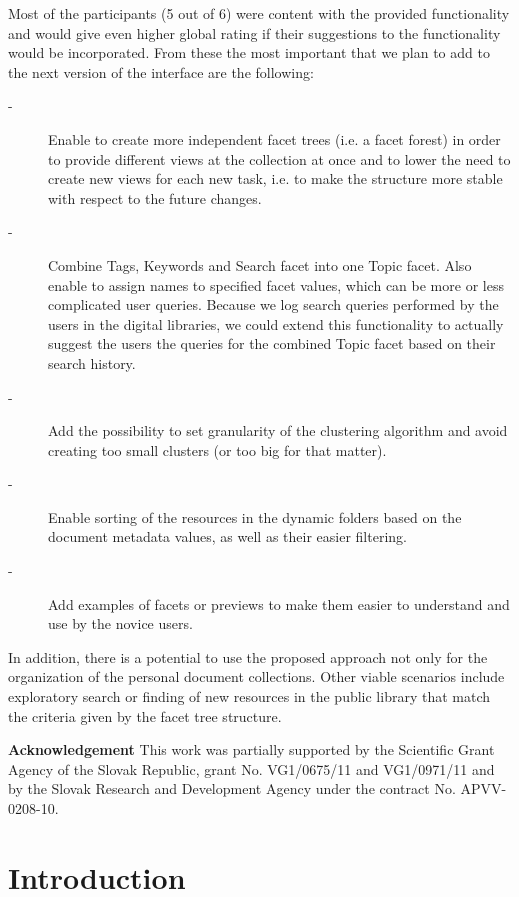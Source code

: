 \documentclass{article}
\begin{document}
  Most of the participants (5 out of 6) were content with the provided functionality and would give even higher global rating if their suggestions to the functionality would be incorporated. From these the most important that we plan to add to the next version of the interface are the following: 
  
\begin{description}
\item[-] Enable to create more independent facet trees (i.e. a facet forest) in order to provide different views at the collection at once and to lower the need to create new views for each new task, i.e. to make the structure more stable with respect to the future changes.
\item[-]Combine Tags, Keywords and Search facet into one Topic facet. Also enable to assign names to specified facet values, which can be more or less complicated user queries. Because we log search queries performed by the users in the digital libraries, we could extend this functionality to actually suggest the users the queries for the combined Topic facet based on their search history. 
\item[-]Add the possibility to set granularity of the clustering algorithm and avoid creating too small clusters (or too big for that matter). 
\item[-] Enable sorting of the resources in the dynamic folders based on the document metadata values, as well as their easier filtering. 
\item[-] Add examples of facets or previews to make them easier to understand and use by the novice users. 
\end{description}

In addition, there is a potential to use the proposed approach not only for the organization of the personal document collections. Other viable scenarios include exploratory search or finding of new resources in the public library that match the criteria given by the facet tree structure.
 

\textbf{Acknowledgement } This work was partially supported by the Scientific Grant Agency of the Slovak Republic, grant No. VG1/0675/11 and VG1/0971/11 and by the Slovak Research and Development Agency under the contract No. APVV-0208-10.






\section{Introduction}
\end{document}
